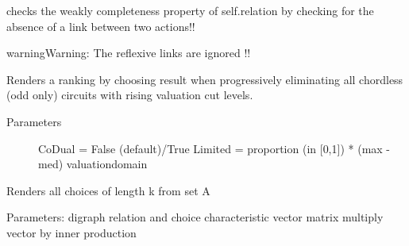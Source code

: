 \documentclass[letterpaper,10pt,english]{sphinxmanual}
\begin{document}
\begin{fulllineitems}
\begin{fulllineitems}
\end{fulllineitems}


\begin{fulllineitems}
\label{techDoc:digraphs.Digraph.isWeaklyComplete}
checks the weakly completeness property of self.relation by checking
for the absence of a link between two actions!!

\begin{notice}{warning}{Warning:}
The reflexive links are ignored !!
\end{notice}

\end{fulllineitems}


\begin{fulllineitems}
\label{techDoc:digraphs.Digraph.iterateRankingByChoosing}
Renders a ranking by choosing result when progressively eliminating
all chordless (odd only) circuits with rising valuation cut levels.
\begin{description}
\item[{Parameters}] \leavevmode
CoDual = False (default)/True
Limited = proportion (in {[}0,1{]}) * (max - med) valuationdomain

\end{description}

\end{fulllineitems}


\begin{fulllineitems}
\label{techDoc:digraphs.Digraph.kChoices}
Renders all choices of length k from set A

\end{fulllineitems}


\begin{fulllineitems}
\label{techDoc:digraphs.Digraph.matmult2}
Parameters: digraph relation and choice characteristic vector
matrix multiply vector by inner production


\end{fulllineitems}
\end{fulllineitems}
\end{document}

